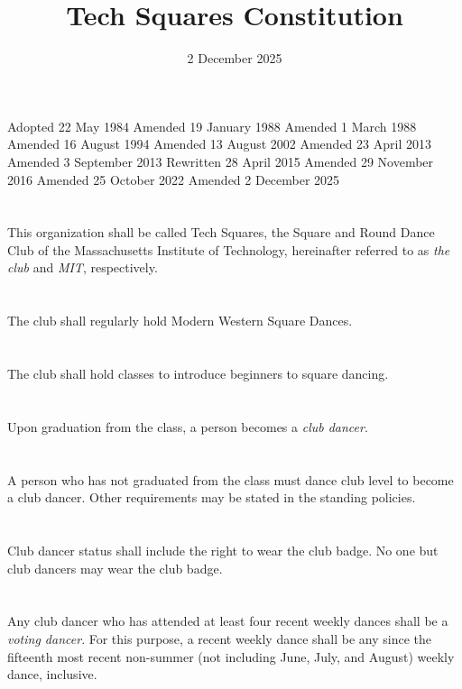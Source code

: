 \documentclass{bylaws}
\title{Tech Squares Constitution}
\date{2 December 2025}
\begin{document}
\maketitle

\begin{history}
Adopted 22 May 1984
Amended 19 January 1988
Amended 1 March 1988
Amended 16 August 1994
Amended 13 August 2002
Amended 23 April 2013
Amended 3 September 2013
Rewritten 28 April 2015
Amended 29 November 2016
Amended 25 October 2022
Amended 2 December 2025
\end{history}


\section{}This organization shall be called Tech Squares, the Square and Round Dance Club of the Massachusetts Institute of Technology, hereinafter referred to as \textit{the club} and \textit{MIT}, respectively.
\section{}The club shall regularly hold Modern Western Square Dances.
\section{}The club shall hold classes to introduce beginners to square dancing.


\section{}Upon graduation from the class, a person becomes a \textit{club dancer}.
\section{}A person who has not graduated from the class must dance club level to become a club dancer. Other requirements may be stated in the standing policies.
\section{}Club dancer status shall include the right to wear the club badge. No one but club dancers may wear the club badge.
\section{}Any club dancer who has attended at least four recent weekly dances shall be a \textit{voting dancer}. For this purpose, a recent weekly dance shall be any since the fifteenth most recent non-summer (not including June, July, and August) weekly dance, inclusive.
\end{document}
